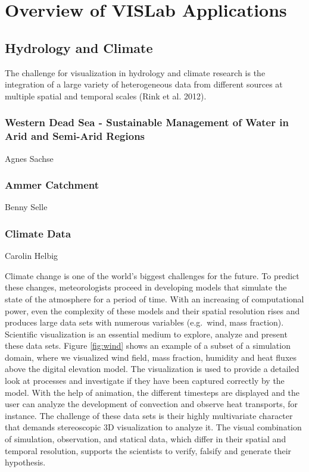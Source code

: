 \section{Overview of VISLab Applications}
\label{overview-of-VISLab-applications}

\subsection{Hydrology and Climate}
\label{hydrology-and-climate}

The challenge for visualization in hydrology and climate research is the
integration of a large variety of heterogeneous data from different
sources at multiple spatial and temporal scales (Rink et al. 2012).

\subsubsection{Western Dead Sea - Sustainable Management of Water in Arid and Semi-Arid
Regions}
\label{western-dead-sea---sustainable-management-of-water-in-arid-and-semi-arid-regions}

Agnes Sachse \cite{graebe:modelcare}

\subsubsection{Ammer Catchment}
\label{ammer-catchment}

Benny Selle

\subsubsection{Climate Data}
\label{climate-data}

Carolin Helbig

Climate change is one of the world's biggest challenges for the future.
To predict these changes, meteorologists proceed in developing models
that simulate the state of the atmosphere for a period of time. With an
increasing of computational power, even the complexity of these models and
their spatial resolution rises and produces large data sets with numerous
variables (e.g.~wind, mass fraction). Scientific visualization is an
essential medium to explore, analyze and present these data sets. Figure
\ref{fig:wind} shows an example of a subset of a simulation domain, where we
visualized wind field, mass fraction, humidity and heat fluxes above the digital elevation model. The visualization is used to
provide a detailed look at processes and investigate if they have been
captured correctly by the model. With the help of animation, the
different timesteps are displayed and the user can analyze the
development of convection and observe heat transports, for instance. The
challenge of these data sets is their highly multivariate character that
demands stereoscopic 3D visualization to analyze it. The visual
combination of simulation, observation, and statical data, which differ
in their spatial and temporal resolution, supports the scientists to
verify, falsify and generate their hypothesis. \cite{helbig:eesenvirvis}

